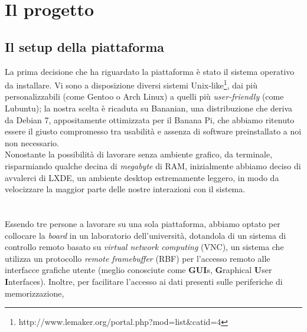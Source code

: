
\chapter{Il progetto} %

\label{Chapter6} %



\section{Il setup della piattaforma}
La prima decisione che ha riguardato la piattaforma è stato il sistema 
operativo da installare. Vi sono a disposizione diversi sistemi 
Unix-like\footnote{http://www.lemaker.org/portal.php?mod=list\&catid=4}, 
dai più personalizzabili (come Gentoo o Arch Linux) a quelli più
 \emph{user-friendly} (come Lubuntu); la nostra scelta è ricaduta su Bananian, 
una distribuzione che deriva da Debian 7, appositamente ottimizzata per il 
Banana Pi, che abbiamo ritenuto essere il giusto compromesso tra usabilità
e assenza di software preinstallato a noi non necessario. \\
Nonostante la possibilità di lavorare senza ambiente grafico, da terminale, 
risparmiando qualche decina di \emph{megabyte} di RAM, inizialmente abbiamo 
deciso di avvalerci di LXDE, un ambiente desktop estremamente leggero, in modo da 
velocizzare la maggior parte delle nostre interazioni con il sistema. \\
\\ \\
Essendo tre persone a lavorare su una sola piattaforma, abbiamo optato 
per collocare la \emph{board} in un laboratorio dell'università, dotandola
di un sistema di controllo remoto basato su \emph{virtual network computing} 
(VNC), un sistema che utilizza un protocollo \emph{remote framebuffer} (RBF) 
per l'accesso remoto alle interfacce grafiche utente (meglio conosciute come 
\textbf{GUI}s, \textbf{G}raphical \textbf{U}ser \textbf{I}nterfaces). Inoltre, 
per facilitare l'accesso ai dati presenti sulle periferiche di memorizzazione, 
